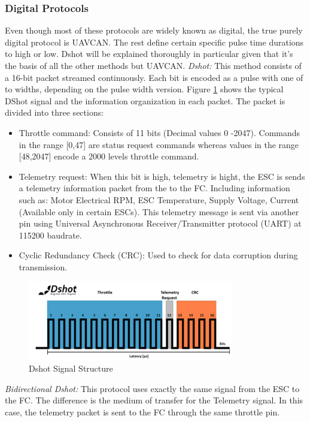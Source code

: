 \subsubsection{Digital Protocols}
Even though most of these protocols are widely known as digital, the true purely digital protocol is UAVCAN. The rest define certain specific pulse time durations to high or low. Dshot will be explained thoroughly in particular given that it's the basis of all the other methods but UAVCAN.
\newline
\textit{Dshot: } This method consists of a 16-bit packet streamed continuously. Each bit is encoded as a pulse with one of to widths, depending on the pulse width version. Figure \ref{fig:dshot} shows the typical DShot signal and the information organization in each packet. The packet is divided into three sections: 
\begin{itemize}
    \item Throttle command: Consists of 11 bits (Decimal values 0 -2047). Commands in the range [0,47] are status request commands whereas values in the range [48,2047] encode a 2000 levels throttle command.
    \item Telemetry request: When this bit is high, telemetry is hight, the ESC is sends a telemetry information packet from the to the FC. Including information such as: Motor Electrical RPM, ESC Temperature, Supply Voltage, Current (Available only in certain ESCs). This telemetry message is sent via another pin using Universal Asynchronous Receiver/Transmitter protocol (UART) at 115200 baudrate.
    \item Cyclic Redundancy Check (CRC): Used to check for data corruption during transmission.
\end{itemize}

\begin{figure}
    \centering
    \includegraphics[width=0.8\textwidth]{images/dshot_sketch.png}
    \caption{Dshot Signal Structure \cite{Speedgoat2020}}
    \label{fig:dshot}
\end{figure}

\textit{Bidirectional Dshot:} This protocol uses exactly the same signal from the ESC to the FC. The difference is the medium of transfer for the Telemetry signal. In this case, the telemetry packet is sent to the FC through the same throttle pin.
\newline

